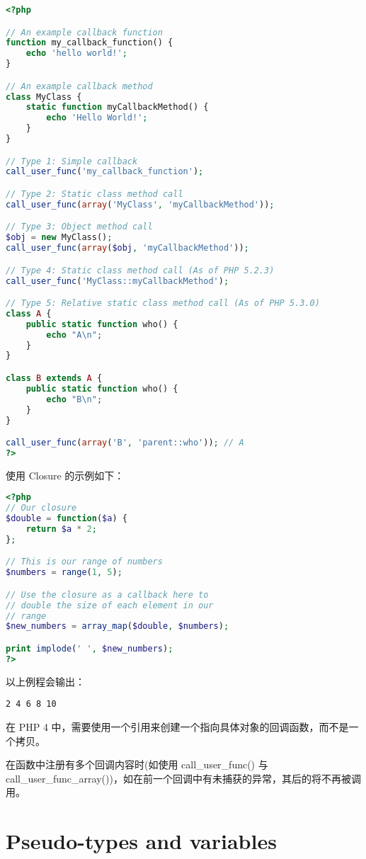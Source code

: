 \begin{lstlisting}[language=PHP]
<?php 

// An example callback function
function my_callback_function() {
    echo 'hello world!';
}

// An example callback method
class MyClass {
    static function myCallbackMethod() {
        echo 'Hello World!';
    }
}

// Type 1: Simple callback
call_user_func('my_callback_function'); 

// Type 2: Static class method call
call_user_func(array('MyClass', 'myCallbackMethod')); 

// Type 3: Object method call
$obj = new MyClass();
call_user_func(array($obj, 'myCallbackMethod'));

// Type 4: Static class method call (As of PHP 5.2.3)
call_user_func('MyClass::myCallbackMethod');

// Type 5: Relative static class method call (As of PHP 5.3.0)
class A {
    public static function who() {
        echo "A\n";
    }
}

class B extends A {
    public static function who() {
        echo "B\n";
    }
}

call_user_func(array('B', 'parent::who')); // A
?>
\end{lstlisting}

 使用 Closure 的示例如下：
 
 
\begin{lstlisting}[language=PHP]
<?php
// Our closure
$double = function($a) {
    return $a * 2;
};

// This is our range of numbers
$numbers = range(1, 5);

// Use the closure as a callback here to 
// double the size of each element in our 
// range
$new_numbers = array_map($double, $numbers);

print implode(' ', $new_numbers);
?>
\end{lstlisting}

以上例程会输出：

\begin{verbatim}
2 4 6 8 10
\end{verbatim}


在 PHP 4 中，需要使用一个引用来创建一个指向具体对象的回调函数，而不是一个拷贝。

在函数中注册有多个回调内容时(如使用 call\_user\_func() 与 call\_user\_func\_array())，如在前一个回调中有未捕获的异常，其后的将不再被调用。


\section{Pseudo-types and variables}


